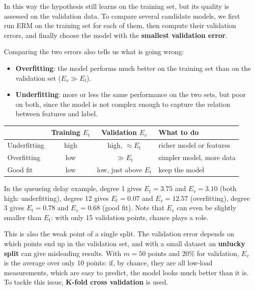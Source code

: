In this way the hypothesis still learns on the training set, but its quality is assessed on the validation data. To compare several candidate models, we first run ERM on the training set for each of them, then compute their validation errors, and finally choose the model with the \textbf{smallest validation error}.

Comparing the two errors also tells us what is going wrong:
\begin{itemize}
    \item \textbf{Overfitting}: the model performs much better on the training set than on the validation set ($E_v \gg E_t$).
    \item \textbf{Underfitting}: more or less the same performance on the two sets, but poor on both, since the model is not complex enough to capture the relation between features and label.
\end{itemize}

\begin{center}
    \begin{tabular}{l|c|c|l}
        & \textbf{Training $E_t$} & \textbf{Validation $E_v$} & \textbf{What to do} \\ \hline
        Underfitting & high & high, $\approx E_t$  & richer model or features \\
        Overfitting  & low  & $\gg E_t$             & simpler model, more data \\
        Good fit     & low  & low, just above $E_t$ & keep the model \\
    \end{tabular}
\end{center}

In the queueing delay example, degree 1 gives $E_t = 3.75$ and $E_v = 3.10$ (both high: underfitting), degree 12 gives $E_t = 0.07$ and $E_v = 12.57$ (overfitting), degree 3 gives $E_t = 0.78$ and $E_v = 0.68$ (good fit). Note that $E_v$ can even be slightly smaller than $E_t$: with only 15 validation points, chance plays a role.

This is also the weak point of a single split. The validation error depends on which points end up in the validation set, and with a small dataset an \textbf{unlucky split} can give misleading results. With $m = 50$ points and 20\% for validation, $E_v$ is the average over only 10 points: if, by chance, they are all low-load measurements, which are easy to predict, the model looks much better than it is. To tackle this issue, \textbf{K-fold cross validation} is used.

